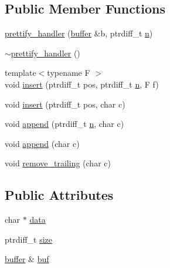 \subsection*{Public Member Functions}
\begin{DoxyCompactItemize}
\item 
\hyperlink{structinternal_1_1prettify__handler_a695b06224b93c0a629c17114f861bdc0}{prettify\+\_\+handler} (\hyperlink{namespaceinternal_a5fcdbc3efad1f390e6c3f0fdafa56122}{buffer} \&b, ptrdiff\+\_\+t \hyperlink{format_8h_a9ab7e5832cef391eb8b1505a601fb215}{n})
\item 
\hyperlink{structinternal_1_1prettify__handler_a96f87d5af83e2986ccff6090aba6e228}{$\sim$prettify\+\_\+handler} ()
\item 
{\footnotesize template$<$typename F $>$ }\\void \hyperlink{structinternal_1_1prettify__handler_aefa1e7bbf120e18221a97a51c6b2048a}{insert} (ptrdiff\+\_\+t pos, ptrdiff\+\_\+t \hyperlink{format_8h_a9ab7e5832cef391eb8b1505a601fb215}{n}, F f)
\item 
void \hyperlink{structinternal_1_1prettify__handler_a528be8c2e3d695004441af781d114bb3}{insert} (ptrdiff\+\_\+t pos, char c)
\item 
void \hyperlink{structinternal_1_1prettify__handler_a9b5bdd4a4766ef7321206498ed201132}{append} (ptrdiff\+\_\+t \hyperlink{format_8h_a9ab7e5832cef391eb8b1505a601fb215}{n}, char c)
\item 
void \hyperlink{structinternal_1_1prettify__handler_a6257058c6ebf0a11075ca4009926af78}{append} (char c)
\item 
void \hyperlink{structinternal_1_1prettify__handler_a0e352c9e5a3e75877a6a62d0ddbe4201}{remove\+\_\+trailing} (char c)
\end{DoxyCompactItemize}
\subsection*{Public Attributes}
\begin{DoxyCompactItemize}
\item 
char $\ast$ \hyperlink{structinternal_1_1prettify__handler_ad15c526bcb66f483380a4bdda8501513}{data}
\item 
ptrdiff\+\_\+t \hyperlink{structinternal_1_1prettify__handler_a1cd507db31f66da340fbe3af614263a3}{size}
\item 
\hyperlink{namespaceinternal_a5fcdbc3efad1f390e6c3f0fdafa56122}{buffer} \& \hyperlink{structinternal_1_1prettify__handler_a4dff35fc9f5fb77e2d294be91dc9a0b9}{buf}
\end{DoxyCompactItemize}


